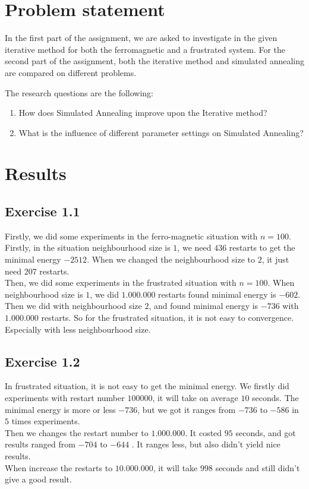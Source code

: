 \documentclass[10pt,a4paper]{article}
\begin{document}
\section{Problem statement}
In the first part of the assignment, we are asked to investigate in the given iterative method for both the ferromagnetic and a frustrated system.
For the second part of the assignment, both the iterative method and simulated annealing are compared on different problems.

The research questions are the following:
\begin{enumerate}
\item How does Simulated Annealing improve upon the Iterative method?
\item What is the influence of different parameter settings on Simulated Annealing?
\end{enumerate}

\section{Results}
\subsection{Exercise 1.1}
Firstly, we did some experiments in the ferro-magnetic situation with $n=100$. Firstly, in the situation neighbourhood size is $1$, we need $436$ restarts to get the minimal energy $-2512$. When we changed the neighbourhood size to $2$, it just need $207$ restarts.\\
Then, we did some experiments in the frustrated situation with $n=100$. When neighbourhood size is $1$, we did $1.000.000$ restarts found minimal energy is $-602$. Then we did with neighbourhood size $2$, and found minimal energy is $-736$ with $1.000.000$ restarts. So for the frustrated situation, it is not easy to convergence. Especially with less neighbourhood size.
\subsection{Exercise 1.2}
In frustrated situation, it is not easy to get the minimal energy.
We firstly did experiments with restart number $100000$, it will take on average $10$ seconds. The minimal energy is more or less $-736$, but we got it ranges from $-736$ to $-586$ in $5$ times experiments.\\
Then we changes the restart number to $1.000.000$. It costed $95$ seconds, and got results ranged from $-704$ to $-644$ . It ranges less, but also didn't yield nice results.\\
When increase the restarts to $10.000.000$, it will take $998$ seconds and still didn't give a good result.
\end{document}
